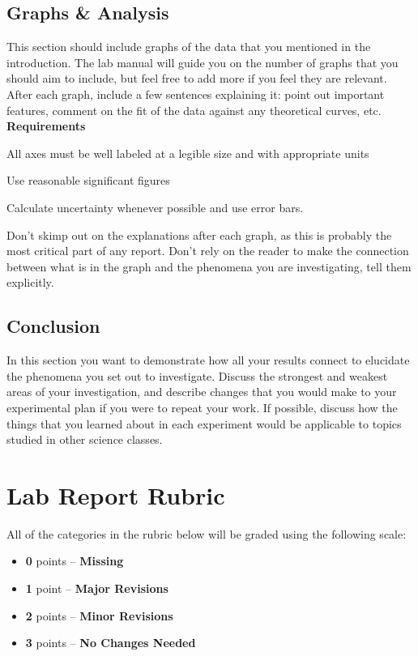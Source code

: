 \subsection*{Graphs \& Analysis}
This section should include graphs of the data that you mentioned in the introduction.
The lab manual will guide you on the number of graphs that you should aim to include, but feel free to add more if you feel they are relevant.
After each graph, include a few sentences explaining it: point out important features, comment on the fit of the data against any theoretical curves, etc. \\
\textbf{Requirements}
\begin{list}{-}{\topsep=0pt \itemsep=-2pt}
	\item All axes must be well labeled at a legible size and with appropriate units
	\item Use reasonable significant figures
	\item Calculate uncertainty whenever possible and use error bars.
	\item Don't skimp out on the explanations after each graph, as this is probably the most critical part of any report. Don't rely on the reader to make the connection between what is in the graph and the phenomena you are investigating, tell them explicitly.
\end{list}

\subsection*{Conclusion}
In this section you want to demonstrate how all your results connect to elucidate the phenomena you set out to investigate.
Discuss the strongest and weakest areas of your investigation, and describe changes that you would make to your experimental plan if you were to repeat your work.
If possible, discuss how the things that you learned about in each experiment would be applicable to topics studied in other science classes.

\newpage

\section*{Lab Report Rubric}
All of the categories in the rubric below will be graded using the following scale:
\begin{itemize}
\itemsep-0.5em
\item \textbf{0} points – \textbf{Missing}
\item \textbf{1} point – \textbf{Major Revisions} 
\item \textbf{2} points – \textbf{Minor Revisions} 
\item \textbf{3} points – \textbf{No Changes Needed}
\end{itemize}

